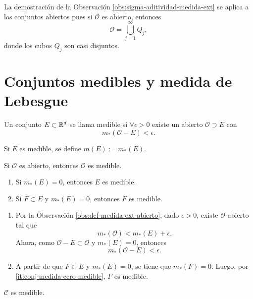 La demostraci\'on de la Observaci\'on \ref{obs:sigma-aditividad-medida-ext} se aplica a los conjuntos abiertos pues si
$\mathcal{O}$ es abierto, entonces
\[
\mathcal{O}=\bigcup\limits_{j=1}^{\infty} Q_j,
\]
donde los cubos $Q_j$ son casi disjuntos.


\section{Conjuntos medibles y medida de Lebesgue}

\begin{definicion}{}
Un conjunto $E\subset \mathbb{R}^d$ se llama medible si $\forall \epsilon>0$ existe un abierto $\mathcal{O}\supset E$
con 
\[
m_{*}(\mathcal{O}-E)<\epsilon.
\]
\end{definicion}

Si $E$ es medible, se define $m(E):=m_{*}(E)$.

\begin{proposicion}{}
Si $\mathcal{O}$ es abierto, entonces $\mathcal{O}$ es medible.
\end{proposicion}

\begin{proposicion}{}
\begin{enumerate}
    \item\label{it:conj-medida-cero-medible} Si $m_{*}(E)=0$, entonces $E$ es medible. 
    \item Si $F\subset E$ y $m_{*}(E)=0$, entonces $F$ es medible.
\end{enumerate}
\end{proposicion}

\begin{demo}
\begin{enumerate}
    \item Por la Observaci\'on \ref{obs:def-medida-ext-abierto}, 
    dado $\epsilon>0$, existe $\mathcal{O}$ abierto tal que 
    \[
    m_{*}(\mathcal{O})<m_{*}(E)+\epsilon.
    \]
    Ahora, como $\mathcal{O}-E \subset \mathcal{O}$ y $m_{*}(E)=0$, entonces 
    \[
    m_{*}(\mathcal{O}-E)<\epsilon.
    \]

\item  A partir de que $F\subset E$ y $m_{*}(E)=0$, se tiene que $m_{*}(F)=0$. 
Luego, por \ref{it:conj-medida-cero-medible}, $F$ es medible.
\end{enumerate}
\end{demo}

\begin{observacion}{}
$\mathscr{C}$ es medible.
\end{observacion}